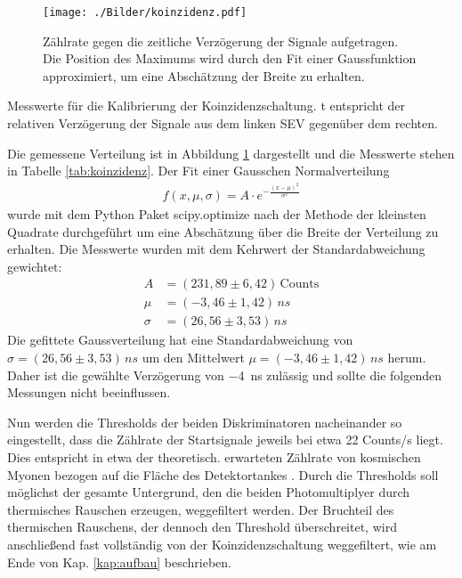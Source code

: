 \begin{figure}[htbp]
	\texttt{[image: ./Bilder/koinzidenz.pdf]}
	\caption{Zählrate gegen die zeitliche Verzögerung der Signale aufgetragen. Die Position des Maximums wird durch den Fit einer Gaussfunktion approximiert, um eine Abschätzung der Breite zu erhalten.}
	\label{fig:koinzidenz}
\end{figure}

\begin{table}[htbp]
	
	\caption{Messwerte für die Kalibrierung der Koinzidenzschaltung. t entspricht der relativen Verzögerung der Signale aus dem linken SEV gegenüber dem rechten.}
	\label{tab:koinzidenz}
\end{table}

Die gemessene Verteilung ist in Abbildung \ref{fig:koinzidenz} dargestellt und die Messwerte stehen in Tabelle \ref{tab:koinzidenz}. Der Fit einer Gausschen Normalverteilung
\begin{align}
	f(x,\mu,\sigma) = A\cdot e^{-\frac{(x-\mu)^2}{\sigma^2}}
\end{align}
wurde mit dem Python Paket scipy.optimize nach der Methode der kleinsten Quadrate durchgeführt um eine Abschätzung über die Breite der Verteilung zu erhalten. Die Messwerte wurden mit dem Kehrwert der Standardabweichung gewichtet:
\begin{align}
A &= (231,89 \pm 6,42)\,\text{Counts}\\
\mu &= (-3,46 \pm 1,42)\,\si{ns}\\
\sigma &= ({26,56} \pm 3,53)\,\si{ns}
\end{align}
Die gefittete Gaussverteilung hat eine Standardabweichung von $\sigma = ({26,56} \pm 3,53)\,\si{ns}$ um den Mittelwert $\mu = (-3,46 \pm 1,42)\,\si{ns}$ herum. Daher ist die gewählte Verzögerung von \SI{-4}{ns} zulässig und sollte die folgenden Messungen nicht beeinflussen.

Nun werden die Thresholds der beiden Diskriminatoren nacheinander so eingestellt, dass die Zählrate der Startsignale jeweils bei etwa 22 Counts/s liegt. Dies entspricht in etwa der theoretisch.
 erwarteten Zählrate von kosmischen Myonen bezogen auf die Fläche des Detektortankes \cite{Anl}. Durch die Thresholds soll möglichst der gesamte Untergrund, den die beiden Photomultiplyer durch thermisches Rauschen erzeugen, weggefiltert werden. Der Bruchteil des thermischen Rauschens, der dennoch den Threshold überschreitet, wird anschließend fast vollständig von der Koinzidenzschaltung weggefiltert, wie am Ende von Kap. \ref{kap:aufbau} beschrieben.


